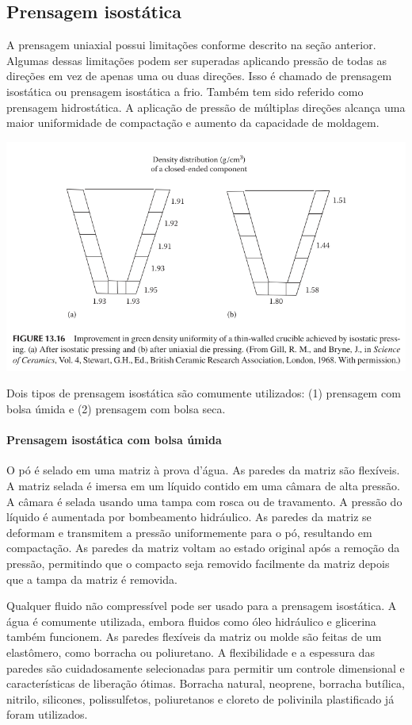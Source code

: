 \subsection*{Prensagem isostática}

A prensagem uniaxial possui limitações conforme descrito na seção anterior. Algumas dessas limitações podem ser superadas aplicando pressão de todas as direções em vez de apenas uma ou duas direções. Isso é chamado de prensagem isostática ou prensagem isostática a frio. Também tem sido referido como prensagem hidrostática. A aplicação de pressão de múltiplas direções alcança uma maior uniformidade de compactação e aumento da capacidade de moldagem.

\includegraphics*[width=\linewidth]{./images/prensagem_isostatica.png}

Dois tipos de prensagem isostática são comumente utilizados: (1) prensagem com bolsa úmida e (2) prensagem com bolsa seca.

\paragraph*{Prensagem isostática com bolsa úmida}

O pó é selado em uma matriz à prova d'água. As paredes da matriz são flexíveis. A matriz selada é imersa em um líquido contido em uma câmara de alta pressão. A câmara é selada usando uma tampa com rosca ou de travamento. A pressão do líquido é aumentada por bombeamento hidráulico. As paredes da matriz se deformam e transmitem a pressão uniformemente para o pó, resultando em compactação. As paredes da matriz voltam ao estado original após a remoção da pressão, permitindo que o compacto seja removido facilmente da matriz depois que a tampa da matriz é removida.

Qualquer fluido não compressível pode ser usado para a prensagem isostática. A água é comumente utilizada, embora fluidos como óleo hidráulico e glicerina também funcionem. As paredes flexíveis da matriz ou molde são feitas de um elastômero, como borracha ou poliuretano. A flexibilidade e a espessura das paredes são cuidadosamente selecionadas para permitir um controle dimensional e características de liberação ótimas. Borracha natural, neoprene, borracha butílica, nitrilo, silicones, polissulfetos, poliuretanos e cloreto de polivinila plastificado já foram utilizados.


